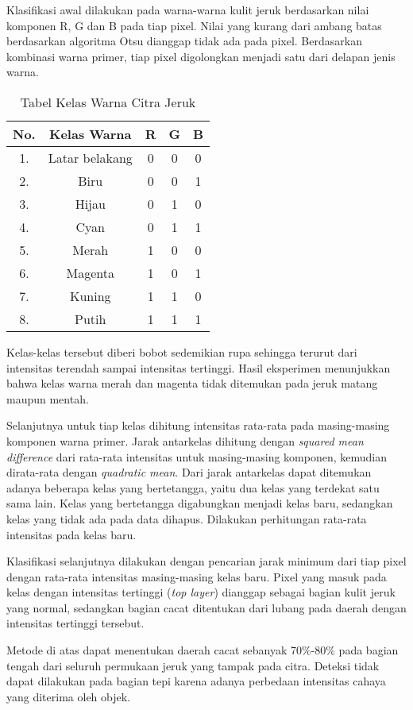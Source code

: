 \documentclass[laporan.tex]{subfiles}
\begin{document}
Klasifikasi awal dilakukan pada warna-warna kulit jeruk berdasarkan nilai komponen R, G dan B pada tiap pixel. Nilai yang kurang dari ambang batas berdasarkan algoritma Otsu dianggap tidak ada pada pixel. Berdasarkan kombinasi warna primer, tiap pixel digolongkan menjadi satu dari delapan jenis warna.

\begin{table}
\centering
\begin{tabular}{|c|c|c|c|c|}
\hline
No. & Kelas Warna & R & G & B \\
\hline
1. & Latar belakang & 0 & 0 & 0 \\
2. & Biru & 0 & 0 & 1 \\
3. & Hijau & 0 & 1 & 0 \\
4. & Cyan & 0 & 1 & 1 \\
5. & Merah & 1 & 0 & 0 \\
6. & Magenta & 1 & 0 & 1 \\
7. & Kuning & 1 & 1 & 0 \\
8. & Putih & 1 & 1 & 1 \\
\hline
\end{tabular}
\caption{Tabel Kelas Warna Citra Jeruk}
\label{table:colorclass}
\end{table}

Kelas-kelas tersebut diberi bobot sedemikian rupa sehingga terurut dari intensitas terendah sampai intensitas tertinggi. Hasil eksperimen menunjukkan bahwa kelas warna merah dan magenta tidak ditemukan pada jeruk matang maupun mentah.

Selanjutnya untuk tiap kelas dihitung intensitas rata-rata pada masing-masing komponen warna primer. Jarak antarkelas dihitung dengan \emph{squared mean difference} dari rata-rata intensitas untuk masing-masing komponen, kemudian dirata-rata dengan \emph{quadratic mean}. Dari jarak antarkelas dapat ditemukan adanya beberapa kelas yang bertetangga, yaitu dua kelas yang terdekat satu sama lain. Kelas yang bertetangga digabungkan menjadi kelas baru, sedangkan kelas yang tidak ada pada data dihapus. Dilakukan perhitungan rata-rata intensitas pada kelas baru.

Klasifikasi selanjutnya dilakukan dengan pencarian jarak minimum dari tiap pixel dengan rata-rata intensitas masing-masing kelas baru. Pixel yang masuk pada kelas dengan intensitas tertinggi (\emph{top layer}) dianggap sebagai bagian kulit jeruk yang normal, sedangkan bagian cacat ditentukan dari lubang pada daerah dengan intensitas tertinggi tersebut.

Metode di atas dapat menentukan daerah cacat sebanyak 70\%-80\% pada bagian tengah dari seluruh permukaan jeruk yang tampak pada citra. Deteksi tidak dapat dilakukan pada bagian tepi karena adanya perbedaan intensitas cahaya yang diterima oleh objek.
\end{document}
